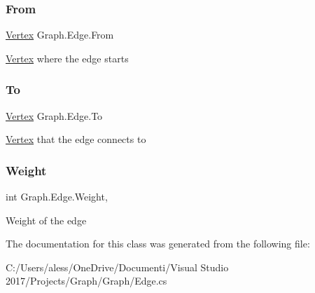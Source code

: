 \subsubsection{\texorpdfstring{From}{From}}
{\footnotesize\ttfamily \hyperlink{class_graph_1_1_vertex}{Vertex} Graph.\+Edge.\+From\hspace{0.3cm}{\ttfamily [get]}}



\hyperlink{class_graph_1_1_vertex}{Vertex} where the edge starts 

\mbox{\label{class_graph_1_1_edge_a55661e4bd903eb6d33e48129124360e8}} 
\subsubsection{\texorpdfstring{To}{To}}
{\footnotesize\ttfamily \hyperlink{class_graph_1_1_vertex}{Vertex} Graph.\+Edge.\+To\hspace{0.3cm}{\ttfamily [get]}}



\hyperlink{class_graph_1_1_vertex}{Vertex} that the edge connects to 

\mbox{\label{class_graph_1_1_edge_a34f6965d86e366584d5679bba8fe54ad}} 
\subsubsection{\texorpdfstring{Weight}{Weight}}
{\footnotesize\ttfamily int Graph.\+Edge.\+Weight\hspace{0.3cm}{\ttfamily [get]}, {\ttfamily [set]}}



Weight of the edge 



The documentation for this class was generated from the following file\+:\begin{DoxyCompactItemize}
\item 
C\+:/\+Users/aless/\+One\+Drive/\+Documenti/\+Visual Studio 2017/\+Projects/\+Graph/\+Graph/Edge.\+cs\end{DoxyCompactItemize}
